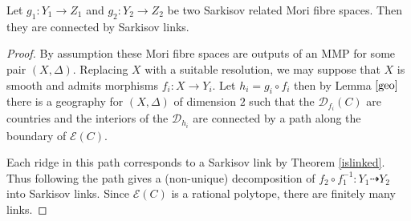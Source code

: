	\begin{theorem}\label{sarkisov}
		Let $g_{1}:Y_{1} \to Z_{1}$ and $g_{2}:Y_{2} \to Z_{2}$ be two Sarkisov related Mori fibre spaces. Then they are connected by Sarkisov links.
	\end{theorem}

	\begin{proof}
		
		By assumption these Mori fibre spaces are outputs of an MMP for some pair $(X,\Delta)$. Replacing $X$ with a suitable resolution, we may suppose that $X$ is smooth and admits morphisms $f_{i}:X \to Y_{i}$. Let $h_{i}=g_{i} \circ f_{i}$ then by Lemma $\ref{geo}$ there is a geography for $(X,\Delta)$ of dimension $2$ such that the $\mathcal{D}_{f_{i}}(C)$ are countries and the interiors of the $\mathcal{D}_{h_{i}}$ are connected by a path along the boundary of $\mathcal{E}(C)$. 
		
		Each ridge in this path corresponds to a Sarkisov link by Theorem \ref{islinked}. Thus following the path gives a (non-unique) decomposition of $f_{2} \circ f_{1}^{-1} \colon Y_{1} \dashrightarrow Y_{2}$ into Sarkisov links. Since $\mathcal{E}(C)$ is a rational polytope, there are finitely many links.
		
		
	\end{proof}

%	
%	
%	
%


